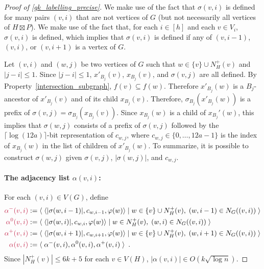 \documentclass{patmorin}
\makeatletter
\renewcommand{\le}{\leqslant}
\def\mathcolor#1#{\@mathcolor{#1}}
\def\@mathcolor#1#2#3{%
  \protect\leavevmode
  \begingroup
    \color#1{#2}#3%
  \endgroup
}
\newcommand{\mathdefin}[1]{\mathcolor{brightmaroon}{#1}}
\newcommand{\Oh}{O}
\makeatother
\begin{document}
\begin{proof}[Proof of \cref{gk_labelling_precise}]
  We make use of the fact that $\sigma(v,i)$ is defined for many pairs $(v,i)$ that are not vertices of $G$ (but not necessarily all vertices of $H\boxtimes P$).  We make use of the fact that, for each $i\in[h]$ and each $v\in V_i$, $\sigma(v,i)$ is defined, which implies that $\sigma(v,i)$ is defined if any of $(v,i-1)$, $(v,i)$, or $(v,i+1)$ is a vertex of $G$.

  Let $(v,i)$ and $(w,j)$ be two vertices of $G$ such that $w\in \{v\}\cup N^+_H(v)$ and $|j-i|\le 1$.  Since $|j-i|\le 1$, $x'_{B_j}(v)$, $x_{B_j}(v)$, and $\sigma(v,j)$ are all defined.  By Property~\ref{intersection_subgraph},  $f(v)\subseteq f(w)$.  Therefore  $x'_{B_j}(w)$ is a $B_j$-ancestor of $x'_{B_j}(v)$ and of its child $x_{B_j}(v)$.
  Therefore, $\sigma_{B_j}(x'_{B_j}(w))$ is a prefix of $\sigma(v,j)=\sigma_{B_j}(x_{B_j}(v))$.  Since $x_{B_j}(w)$ is a child of $x_{B_j}'(w)$, this implies that $\sigma(w,j)$ consists of a prefix of $\sigma(v,j)$ followed by the $\lceil\log(12a)\rceil$-bit representation of $c_{w,j}$, where $c_{w,j}\in\{0,\ldots,12a-1\}$ is the index of $x_{B_j}(w)$ in the list of children of $x'_{B_j}(w)$.  To summarize, it is possible to construct $\sigma(w,j)$ given $\sigma(v,j)$, $|\sigma(w,j)|$, and $c_{w,j}$.

  \paragraph{\boldmath The adjacency list $\alpha(v,i)$:}
  For each $(v,i)\in V(G)$, define
  \begin{align*}
    \mathdefin{\alpha^{-}(v,i)}
     & := \langle\; \langle |\sigma(w,i-1)|, c_{w,i-1}, \varphi(w)\rangle \mid w\in \{v\}\cup N^+_H(v),\; (w,i-1)\in N_G((v,i)) \;\rangle   \\
    \mathdefin{\alpha^{0}(v,i)}
     & := \langle\; \langle |\sigma(w,i)|, c_{w,i}, \varphi(w)\rangle \mid w\in N^+_H(v),\; (w,i)\in N_G((v,i)) \;\rangle               \\
    \mathdefin{\alpha^+(v,i)}
     & := \langle\; \langle |\sigma(w,i+1)|, c_{w,i+1}, \varphi(w)\rangle \mid w\in \{v\}\cup N^+_H(v),\; (w,i+1)\in N_G((v,i)) \;\rangle \\
    \mathdefin{\alpha(v,i)}
     & := \langle\; \alpha^-(v,i),\alpha^0(v,i),\alpha^+(v,i) \;\rangle        \enspace .
  \end{align*}
  Since $|N^+_H(v)|\le 6k+5$ for each $v\in V(H)$, $|\alpha(v,i)|\in\Oh(k\sqrt{\log n})$.


\end{proof}
\end{document}

